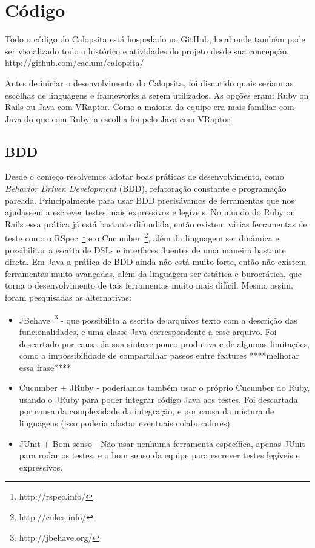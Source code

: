 \section{Código}
Todo o código do Calopsita está hospedado no GitHub, local onde também pode ser visualizado todo o histórico e atividades do projeto desde sua concepção. http://github.com/caelum/calopsita/

Antes de iniciar o desenvolvimento do Calopsita, foi discutido quais seriam as escolhas de linguagens e frameworks a serem utilizados. As opções eram: Ruby on Rails ou Java com VRaptor. Como a maioria da equipe era mais familiar com Java do que com Ruby, a escolha foi pelo Java com VRaptor.

\subsection{BDD}
Desde o começo resolvemos adotar boas práticas de desenvolvimento, como {\it Behavior Driven Development} (BDD), 
refatoração constante e programação pareada. Principalmente para usar BDD precisávamos de ferramentas que nos 
ajudassem a escrever testes mais expressivos e legíveis. No mundo do Ruby on Rails essa prática já está bastante 
difundida, então existem várias ferramentas de teste como o RSpec~\footnote{http://rspec.info/} e o Cucumber~\footnote{http://cukes.info/}, além da linguagem ser dinâmica e possibilitar a escrita de DSLs e interfaces fluentes de uma maneira bastante direta. Em Java a prática de BDD ainda não está muito forte, então não existem ferramentas muito avançadas, além da linguagem ser estática e burocrática, que torna o desenvolvimento de tais ferramentas muito mais difícil. Mesmo assim, foram pesquisadas as alternativas:

\begin{itemize}
	\item{JBehave~\footnote{http://jbehave.org/} - que possibilita a escrita de arquivos texto com a descrição das funcionalidades, e uma classe Java 
correspondente a esse arquivo. Foi descartado por causa da sua sintaxe pouco produtiva e de algumas limitações, 
como a impossibilidade de compartilhar passos entre features ****melhorar essa frase****}
	\item{Cucumber + JRuby - poderíamos também usar o próprio Cucumber do Ruby, usando o JRuby para poder integrar código 
Java aos testes. Foi descartada por causa da complexidade da integração, e por causa da mistura de linguagens (isso poderia afastar eventuais colaboradores).}
	\item{JUnit + Bom senso - Não usar nenhuma ferramenta específica, apenas JUnit para rodar os testes, e o bom senso da 
equipe para escrever testes legíveis e expressivos.}
\end{itemize}

